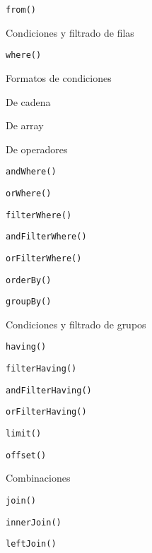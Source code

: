 \begin{longenum}
\begin{longenum}
\begin{longenum}
\begin{longenum}
                \item \texttt{from()}
                \item Condiciones y filtrado de filas
                \begin{longenum}
                    \item \texttt{where()}
                    \item Formatos de condiciones
                    \begin{longenum}
                        \item De cadena
                        \item De array
                        \item De operadores
                    \end{longenum}
                    \item \texttt{andWhere()}
                    \item \texttt{orWhere()}
                    \item \texttt{filterWhere()}
                    \item \texttt{andFilterWhere()}
                    \item \texttt{orFilterWhere()}
                \end{longenum}
                \item \texttt{orderBy()}
                \item \texttt{groupBy()}
                \item Condiciones y filtrado de grupos
                \begin{longenum}
                    \item \texttt{having()}
                    \item \texttt{filterHaving()}
                    \item \texttt{andFilterHaving()}
                    \item \texttt{orFilterHaving()}
                \end{longenum}
                \item \texttt{limit()}
                \item \texttt{offset()}
                \item Combinaciones
                \begin{longenum}
                    \item \texttt{join()}
                    \item \texttt{innerJoin()}
                    \item \texttt{leftJoin()}

\end{longenum}
\end{longenum}
\end{longenum}
\end{longenum}
\end{longenum}
